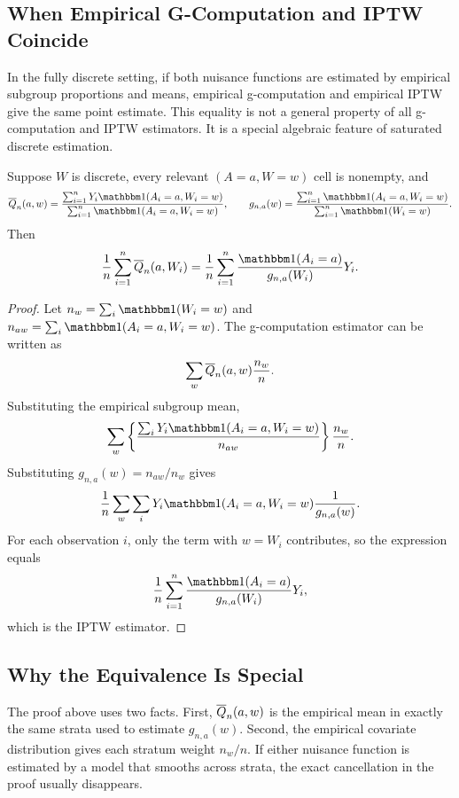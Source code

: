 \label{lec:4-5}

\subsection{When Empirical G-Computation and IPTW Coincide}

In the fully discrete setting, if both nuisance functions are estimated by empirical
subgroup proportions and means, empirical g-computation and empirical IPTW give the
same point estimate. This equality is not a general property of all g-computation and
IPTW estimators. It is a special algebraic feature of saturated discrete estimation.

\begin{proposition}
Suppose $W$ is discrete, every relevant $(A=a,W=w)$ cell is nonempty, and
\[
\Qbar_n(a,w)
=
\frac{\sum_{i=1}^nY_i\ind(A_i=a,W_i=w)}
       {\sum_{i=1}^n\ind(A_i=a,W_i=w)},
\qquad
g_{n,a}(w)
=
\frac{\sum_{i=1}^n\ind(A_i=a,W_i=w)}
       {\sum_{i=1}^n\ind(W_i=w)}.
\]
Then
\[
\frac{1}{n}\sum_{i=1}^n \Qbar_n(a,W_i)
=
\frac{1}{n}\sum_{i=1}^n
\frac{\ind(A_i=a)}{g_{n,a}(W_i)}Y_i.
\]
\end{proposition}

\begin{proof}
Let $n_w=\sum_i\ind(W_i=w)$ and $n_{aw}=\sum_i\ind(A_i=a,W_i=w)$.
The g-computation estimator can be written as
\[
\sum_w \overline{Q}_n(a,w)\frac{n_w}{n}.
\]
Substituting the empirical subgroup mean,
\[
\sum_w
\left\{
\frac{\sum_iY_i\ind(A_i=a,W_i=w)}{n_{aw}}
\right\}
\frac{n_w}{n}.
\]
Substituting $g_{n,a}(w)=n_{aw}/n_w$ gives
\[
\frac{1}{n}\sum_w
\sum_i
Y_i\ind(A_i=a,W_i=w)
\frac{1}{g_{n,a}(w)}.
\]
For each observation $i$, only the term with $w=W_i$ contributes, so the expression
equals
\[
\frac{1}{n}\sum_{i=1}^n
\frac{\ind(A_i=a)}{g_{n,a}(W_i)}Y_i,
\]
which is the IPTW estimator.
\end{proof}

\subsection{Why the Equivalence Is Special}

The proof above uses two facts. First, $\overline{Q}_n(a,w)$ is the empirical mean in exactly
the same strata used to estimate $g_{n,a}(w)$. Second, the empirical covariate
distribution gives each stratum weight $n_w/n$. If either nuisance function is
estimated by a model that smooths across strata, the exact cancellation in the proof
usually disappears.

